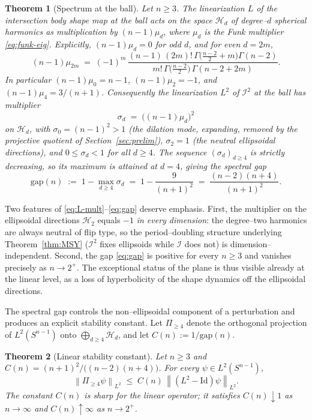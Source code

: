 \documentclass[11pt,reqno]{amsart}
\theoremstyle{plain}
\newtheorem{theorem}{Theorem}[section]
\theoremstyle{definition}
\newcommand{\Sph}{S^{n-1}}
\newcommand{\IB}{\mathcal{I}}
\newcommand{\Hd}[1]{\mathcal{H}_{#1}}
\newcommand{\norm}[1]{\left\lVert #1 \right\rVert}
\begin{document}
\begin{theorem}[Spectrum at the ball]\label{thm:spectrum}
Let $n\ge 3$. The linearization $L$ of the intersection body shape map at the
ball acts on the space $\Hd d$ of degree--$d$ spherical harmonics as
multiplication by $(n-1)\mu_d$, where $\mu_d$ is the Funk multiplier
\eqref{eq:funk-eig}. Explicitly, $(n-1)\mu_d=0$ for odd $d$, and for even
$d=2m$,
\begin{equation}\label{eq:L-mult}
   (n-1)\mu_{2m}
   \;=\;(-1)^m\,\frac{(n-1)\,(2m)!\,\Gamma\!\big(\tfrac{n-2}{2}+m\big)\Gamma(n-2)}
   {m!\,\Gamma\!\big(\tfrac{n-2}{2}\big)\,\Gamma(n-2+2m)} .
\end{equation}
In particular $(n-1)\mu_0 = n-1$, $(n-1)\mu_2 = -1$, and
$(n-1)\mu_4 = 3/(n+1)$. Consequently the linearization $L^2$ of $\IB^2$ at the
ball has multiplier
\[
   \sigma_d \;=\; \big((n-1)\mu_d\big)^2
\]
on $\Hd d$, with $\sigma_0=(n-1)^2>1$ (the dilation mode, expanding, removed by
the projective quotient of Section~\ref{sec:prelim}), $\sigma_2 = 1$ (the
neutral ellipsoidal directions), and $0\le \sigma_d < 1$ for all $d\ge 4$. The
sequence $(\sigma_d)_{d\ge 4}$ is strictly decreasing, so its maximum is
attained at $d=4$, giving the spectral gap
\begin{equation}\label{eq:gap}
   \mathrm{gap}(n)\;:=\;1-\max_{d\ge 4}\sigma_d
   \;=\;1-\frac{9}{(n+1)^2}\;=\;\frac{(n-2)(n+4)}{(n+1)^2}.
\end{equation}
\end{theorem}

Two features of \eqref{eq:L-mult}--\eqref{eq:gap} deserve emphasis. First, the
multiplier on the ellipsoidal directions $\Hd 2$ equals $-1$ \emph{in every
dimension}: the degree--two harmonics are always neutral of flip type, so the
period--doubling structure underlying Theorem~\ref{thm:MSY} ($\IB^2$ fixes
ellipsoids while $\IB$ does not) is dimension--independent. Second, the gap
\eqref{eq:gap} is positive for every $n\ge 3$ and vanishes precisely as
$n\to 2^+$. The exceptional status of the plane is thus visible already at the
linear level, as a loss of hyperbolicity of the shape dynamics off the
ellipsoidal directions.

The spectral gap controls the non--ellipsoidal component of a perturbation and
produces an explicit stability constant. Let $\Pi_{\ge 4}$ denote the
orthogonal projection of $L^2(\Sph)$ onto $\bigoplus_{d\ge 4}\Hd d$, and let
$C(n) := 1/\mathrm{gap}(n)$.

\begin{theorem}[Linear stability constant]\label{thm:linear-stab}
Let $n\ge 3$ and $C(n)=(n+1)^2/\big((n-2)(n+4)\big)$. For every
$\psi\in L^2(\Sph)$,
\[
   \norm{\Pi_{\ge 4}\psi}_{L^2}\;\le\; C(n)\,\norm{(L^2-\mathrm{Id})\psi}_{L^2}.
\]
The constant $C(n)$ is sharp for the linear operator; it satisfies
$C(n)\downarrow 1$ as $n\to\infty$ and $C(n)\uparrow\infty$ as $n\to 2^+$.
\end{theorem}
\end{document}
